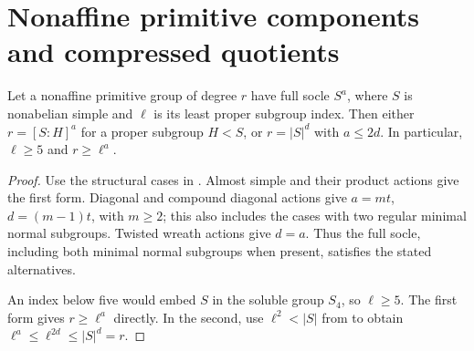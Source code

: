 \section{Nonaffine primitive components and compressed quotients}
\label{sec:primitive-compression}

\begin{lemma}
\label{lem:simple-power-index}
Let a nonaffine primitive group of degree $r$ have full socle $S^a$,
where $S$ is nonabelian simple and $\ell$ is its least proper subgroup
index. Then either $r=[S:H]^a$ for a proper subgroup $H<S$, or
$r=|S|^d$ with $a\leq2d$. In particular, $\ell\geq5$ and
$r\geq\ell^a$.
\end{lemma}
\begin{proof}
Use the structural cases in \cite[\S1 and the theorem on
p.~392]{LiebeckPraegerSaxl1988ONanScott}. Almost simple and their
product actions give the first form. Diagonal and compound diagonal
actions give $a=mt$, $d=(m-1)t$, with $m\geq2$; this also includes
the cases with two regular minimal normal subgroups. Twisted wreath
actions give $d=a$. Thus the full socle, including both minimal
normal subgroups when present, satisfies the stated alternatives.

An index below five would embed $S$ in the soluble group $S_4$,
so $\ell\geq5$. The first form gives $r\geq\ell^a$ directly.
In the second, use $\ell^2<|S|$ from
\cite[Theorem~A(4)]{BallesterBolinchesEstebanRomeroJimenezSeral2022}
to obtain $\ell^a\leq\ell^{2d}\leq|S|^d=r$.
\end{proof}

